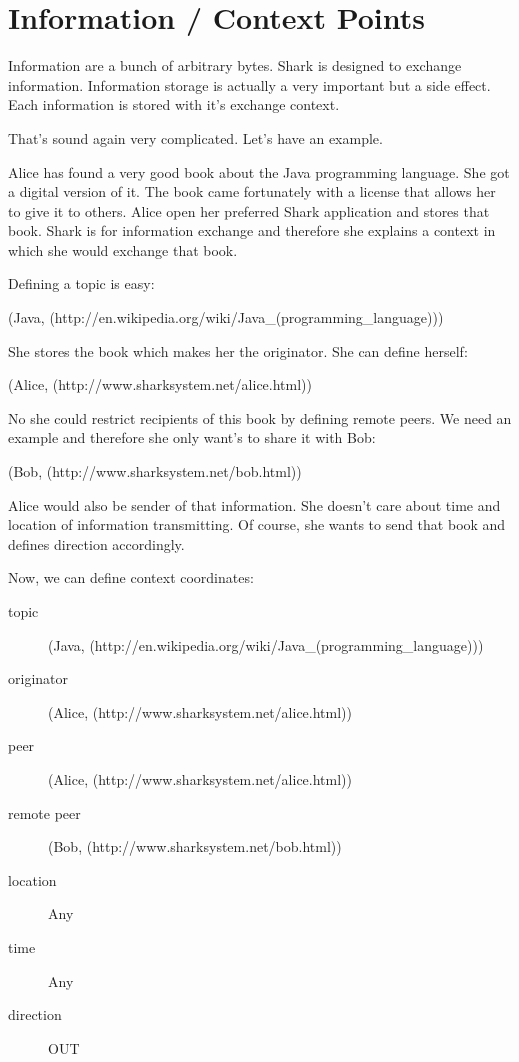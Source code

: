 \section{Information / Context Points}
Information are a bunch of arbitrary bytes. Shark is designed to exchange information. Information storage is actually a very important but a side effect. 
Each information is stored with it's exchange context.

That's sound again very complicated. Let's have an example.

Alice has found a very good book about the Java programming language. She got a digital version of it. The book came fortunately with a license that allows her to give it to others. Alice open her preferred Shark application and stores that book. Shark is for information exchange and therefore she explains a context in which she would exchange that book.

Defining a topic is easy: 

(Java, (http://en.wikipedia.org/wiki/Java\_(programming\_language)))

She stores the book which makes her the originator. She can define herself:

(Alice, (http://www.sharksystem.net/alice.html))

No she could restrict recipients of this book by defining remote peers. We need an example and therefore she only want's to share it with Bob:

(Bob, (http://www.sharksystem.net/bob.html))

Alice would also be sender of that information. She doesn't care about time and location of information transmitting. Of course, she wants to send that book and defines direction accordingly.

Now, we can define context coordinates:

\begin{description}
    \item[topic] 
(Java, (http://en.wikipedia.org/wiki/Java\_(programming\_language)))
    \item[originator] 
(Alice, (http://www.sharksystem.net/alice.html))
    \item[peer] 
(Alice, (http://www.sharksystem.net/alice.html))
    \item[remote peer] 
(Bob, (http://www.sharksystem.net/bob.html))
    \item[location] 
Any
    \item[time] 
Any
    \item[direction] 
OUT
\end{description}

